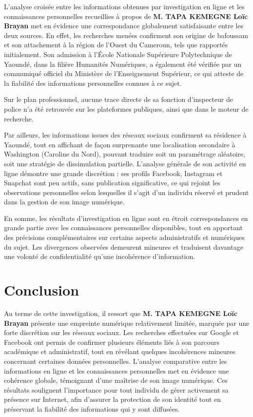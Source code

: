 \documentclass[12pt, a4em]{article}
\begin{document}
	L’analyse croisée entre les informations obtenues par investigation en ligne et les connaissances personnelles recueillies à propos de \textbf{M. TAPA KEMEGNE Loïc Brayan} met en évidence une correspondance globalement satisfaisante entre les deux sources. En effet, les recherches menées confirment son origine de bafoussam et son attachement à la région de l’Ouest du Cameroun, tels que rapportés initialement. Son admission à l’École Nationale Supérieure Polytechnique de Yaoundé, dans la filière Humanités Numériques, a également été vérifiée par un communiqué officiel du Ministère de l’Enseignement Supérieur, ce qui atteste de la fiabilité des informations personnelles connues à ce sujet.  
	
	Sur le plan professionnel, aucune trace directe de sa fonction d’inspecteur de police n’a été retrouvée sur les plateformes publiques, ainsi que dans le moteur de recherche.  
	
	Par ailleurs, les informations issues des réseaux sociaux confirment sa résidence à Yaoundé, tout en affichant de façon surprenante une localisation secondaire à Washington (Caroline du Nord), pouvant traduire soit un paramétrage aléatoire, soit une stratégie de dissimulation partielle. L’analyse générale de son activité en ligne démontre une grande discrétion : ses profils Facebook, Instagram et Snapchat sont peu actifs, sans publication significative, ce qui rejoint les observations personnelles selon lesquelles il s’agit d’un individu réservé et prudent dans la gestion de son image numérique.  
	
	En somme, les résultats d’investigation en ligne sont en étroit correspondances en grande partie avec les connaissances personnelles disponibles, tout en apportant des précisions complémentaires sur certains aspects administratifs et numériques du sujet. Les divergences observées demeurent mineures et traduisent davantage une volonté de confidentialité qu’une incohérence d’information.
	
	
	\pagebreak
	
	\section*{Conclusion}
	
	Au terme de cette investigation, il ressort que \textbf{M. TAPA KEMEGNE Loïc Brayan} présente une empreinte numérique relativement limitée, marquée par une forte discrétion sur les réseaux sociaux. Les recherches effectuées sur Google et Facebook ont permis de confirmer plusieurs éléments liés à son parcours académique et administratif, tout en révélant quelques incohérences mineures concernant certaines données personnelles. L’analyse comparative entre les informations en ligne et les connaissances personnelles met en évidence une cohérence globale, témoignant d’une maîtrise de son image numérique. Ces résultats soulignent l’importance pour tout individu de gérer activement sa présence sur Internet, afin d’assurer la protection de son identité tout en préservant la fiabilité des informations qui y sont diffusées.
	
\end{document}
